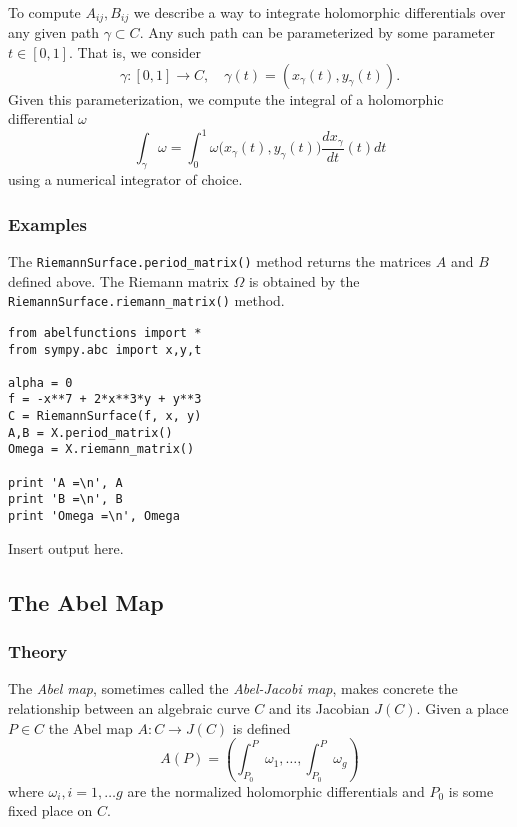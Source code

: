 To compute $A_{ij}, B_{ij}$ we describe a way to integrate holomorphic
differentials over any given path $\gamma \subset C$. Any such path can
be parameterized by some parameter $t \in [0,1]$. That is, we consider
\[
    \gamma : [0,1] \to C, \quad \gamma(t) = (x_\gamma(t), y_\gamma(t)).
\]
Given this parameterization, we compute the integral of a holomorphic
differential $\omega$
\[
    \int_\gamma \omega = \int_0^1 \omega \big(
    x_\gamma(t), y_\gamma(t) \big)
    \frac{dx_\gamma}{dt}(t) dt
\]
using a numerical integrator of choice.

%
\subsubsection*{Examples}
%

The \verb=RiemannSurface.period_matrix()= method returns the matrices
$A$ and $B$ defined above. The Riemann matrix $\Omega$ is obtained by
the \verb=RiemannSurface.riemann_matrix()= method.

\begin{lstlisting}
from abelfunctions import *
from sympy.abc import x,y,t

alpha = 0
f = -x**7 + 2*x**3*y + y**3
C = RiemannSurface(f, x, y)
A,B = X.period_matrix()
Omega = X.riemann_matrix()

print 'A =\n', A
print 'B =\n', B
print 'Omega =\n', Omega
\end{lstlisting}
\begin{pyoutput}
[XXX] Insert output here.
\end{pyoutput}

\subsection{The Abel Map}

%
\subsubsection*{Theory}
%

The {\it Abel map}, sometimes called the {\it Abel-Jacobi map}, makes
concrete the relationship between an algebraic curve $C$ and its
Jacobian $J(C)$. Given a place $P \in C$ the Abel map $A : C \to J(C)$
is defined
\begin{equation} \label{eq: abel-map}
  A(P) = \left(
  \int_{P_0}^P \omega_1, \ldots, \int_{P_0}^P \omega_g
  \right)
\end{equation}
where $\omega_i, i=1,\ldots g$ are the normalized holomorphic
differentials and $P_0$ is some fixed place on $C$.

